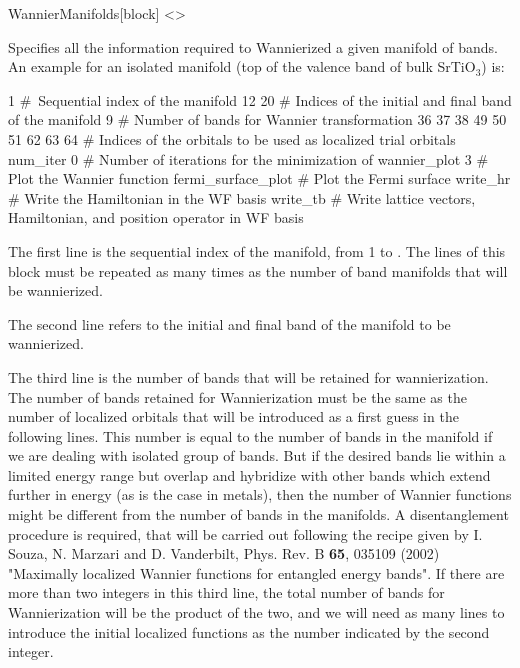   \begin{fdfentry}{WannierManifolds}[block]
  <>

    Specifies all the information required to Wannierized a given
    manifold of bands.
    An example for an isolated manifold (top of the valence band of
    bulk SrTiO$_{3}$) is:

    \begin{fdfexample}
         1                  # Sequential index of the manifold
         12  20             # Indices of the initial and final band of the manifold
         9                  # Number of bands for Wannier transformation
         36 37 38 49 50 51 62 63 64  # Indices of the orbitals to be used as localized trial orbitals
         num_iter 0         # Number of iterations for the minimization of \Omega
         wannier_plot  3    # Plot the Wannier function
         fermi_surface_plot # Plot the Fermi surface
         write_hr           # Write the Hamiltonian in the WF basis
         write_tb           # Write lattice vectors, Hamiltonian, and position operator in WF basis
    \end{fdfexample}

    The first line is the sequential index of the manifold,
    from 1 to .
    The lines of this block must be repeated as many times as the
    number of band manifolds that will be wannierized.

    The second line refers to the initial and final band of the manifold
    to be wannierized.

    The third line is the number of bands that will be retained for
    wannierization.
    The number of bands retained for Wannierization must be the same
    as the number of localized orbitals that will be introduced
    as a first guess in the following lines.
    This number is equal to the number of bands in the manifold if we are
    dealing with isolated group of bands.
    But if the desired bands lie within a limited energy range but
    overlap and hybridize with other bands which extend further in energy
    (as is the case in metals),
    then the number of Wannier functions might be different from the
    number of bands in the manifolds.
    A disentanglement procedure is required, that will be carried out
    following the recipe given by
    I. Souza, N. Marzari and D. Vanderbilt,
    Phys. Rev. B \textbf{65}, 035109 (2002)
    "Maximally localized Wannier functions for entangled energy bands".
    If there are more than two integers in this third line,
    the total number of bands for Wannierization will be the product
    of the two, and we will need as many lines to introduce the
    initial localized functions as the number indicated by the second integer.


\end{fdfentry}
